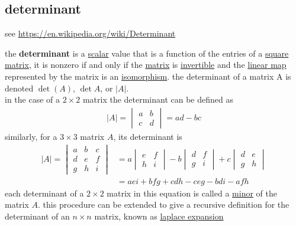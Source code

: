 \documentclass[a4paper,12pt]{article}
\begin{document}
\subsection{determinant}
\label{sec:orgff9607b}
see \url{https://en.wikipedia.org/wiki/Determinant}\\
\begin{definition}
the \textbf{determinant} is a \href{20220727110413-scalar.org}{scalar} value that is a function of the entries of a \hyperref[sec:orgf670bc9]{square matrix}, it is nonzero if and only if the \hyperref[sec:org2833a15]{matrix} is \hyperref[sec:orgb6a6a45]{invertible} and the \hyperref[sec:orgdf3d063]{linear map} represented by the matrix is an \hyperref[sec:orgb9fe876]{isomorphism}. the determinant of a matrix A is denoted \(\det(A)\), \(\det A\), or \(|A|\).\\
in the case of a \(2\times2\) matrix the determinant can be defined as\\
\begin{gather*}
  |A| = \begin{vmatrix} a & b\\ c & d \end{vmatrix} = ad - bc
\end{gather*}
similarly, for a \(3\times3\) matrix \(A\), its determinant is\\
\begin{align*}
  |A| = \begin{vmatrix} a & b & c\\ d & e & f\\ g & h & i \end{vmatrix} &= a\begin{vmatrix} e & f\\ h & i \end{vmatrix} - b\begin{vmatrix} d & f\\ g & i \end{vmatrix} + c\begin{vmatrix} d & e\\ g & h \end{vmatrix}\\
  &= aei + bfg + cdh - ceg - bdi - afh
\end{align*}
each determinant of a \(2\times2\) matrix in this equation is called a \hyperref[sec:org75038da]{minor} of the matrix \(A\). this procedure can be extended to give a recursive definition for the determinant of an \(n\times n\) matrix, known as \hyperref[sec:orgfd4b3c6]{laplace expansion}\\


\end{definition}
\end{document}
